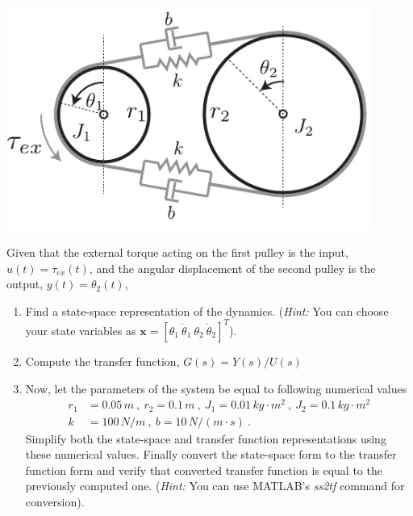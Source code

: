 \documentclass[twoside]{article}
\theoremstyle{definition}
\begin{document}
    \vspace{12pt}
    
\begin{minipage}[h]{1\linewidth}
    \begin{center}
      \includegraphics[width=0.9\textwidth]{beltpulleyelastic}
    \end{center}
\end{minipage}

\vspace{12pt}

Given that the external torque acting on the first pulley is the input, $u(t) = \tau_{ex}(t)$, and the angular displacement of the second pulley
is the output, $y(t) = \theta_2(t)$,

\begin{enumerate}
	\item Find a state-space representation of the dynamics. (\textit{Hint:} You can choose your state variables as $\mathbf{x} = \left[ \theta_1 \ \dot{\theta}_1 \
            \theta_2 \ \dot{\theta}_2 \right]^T$).
	\item Compute the transfer function, $G(s) = Y(s) / U(s)$
	\item Now, let the parameters of the system be equal to following numerical values
	\begin{align*}
		r_1 &= 0.05 \, m \  , \  r_2 = 0.1 \, m   \ , \  J_1 = 0.01 \, kg  \cdot m^2  
		 \ , \  J_2 = 0.1 \, kg  \cdot m^2  \\
		  k &= 100 \, N/m  \ , \ b = 10 \, N/(m \cdot s) \ .
	\end{align*}
	Simplify both the state-space and transfer function representations using these numerical values. 
	Finally convert the state-space form to the transfer function form and verify that converted transfer function
	is equal to the previously computed one. (\textit{Hint:} You can use MATLAB's \textit{ss2tf} command for conversion).
\end{enumerate}
\end{document}

